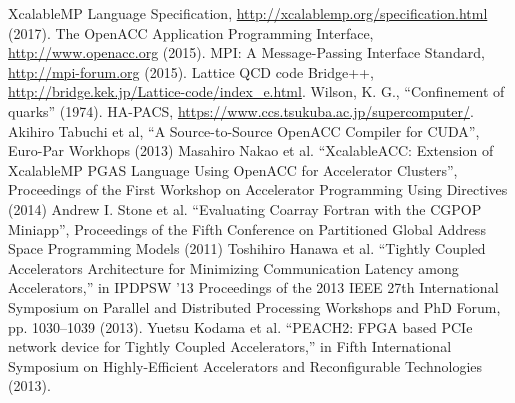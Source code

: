 \documentclass[graybox]{svmult}
\begin{document}
\begin{thebibliography}{99}
  XcalableMP Language Specification, \url{http://xcalablemp.org/specification.html} (2017).
  The OpenACC Application Programming Interface, \url{http://www.openacc.org} (2015).
  MPI: A Message-Passing Interface Standard, \url{http://mpi-forum.org} (2015).
  Lattice QCD code Bridge++, \url{http://bridge.kek.jp/Lattice-code/index\_e.html}.
  Wilson, K. G., ``Confinement of quarks'' (1974).
  HA-PACS, \url{https://www.ccs.tsukuba.ac.jp/supercomputer/}.
  Akihiro Tabuchi et al, ``A Source-to-Source OpenACC Compiler for CUDA'', Euro-Par Workhops (2013)
  Masahiro Nakao et al. ``XcalableACC: Extension of XcalableMP PGAS Language Using OpenACC for Accelerator Clusters'',
   Proceedings of the First Workshop on Accelerator Programming Using Directives (2014)
  Andrew I. Stone et al. ``Evaluating Coarray Fortran with the CGPOP Miniapp'',
   Proceedings of the Fifth Conference on Partitioned Global Address Space Programming Models (2011)
 Toshihiro Hanawa et al. 
 ``Tightly Coupled Accelerators Architecture for Minimizing Communication Latency among Accelerators,'' 
 in IPDPSW ’13 Proceedings of the 2013 IEEE 27th International Symposium on Parallel and Distributed Processing Workshops and PhD Forum, pp. 1030--1039 (2013).
 Yuetsu Kodama et al. 
 ``PEACH2: FPGA based PCIe network device for Tightly Coupled Accelerators,'' 
 in Fifth International Symposium on Highly-Efficient Accelerators and Reconfigurable Technologies (2013).
\end{thebibliography}
\end{document}
